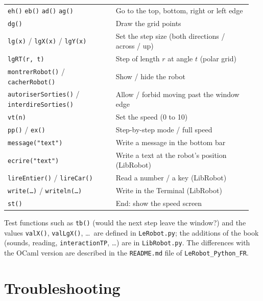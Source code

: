 \documentclass[11pt,a4paper]{article}
\newcommand{\kbd}[1]{\texttt{#1}}
\begin{document}
\begin{longtable}{@{}p{0.42\linewidth} p{0.53\linewidth}@{}}
\kbd{eh()} \kbd{eb()} \kbd{ad()} \kbd{ag()} & Go to the top, bottom, right or left edge \\
\kbd{dg()} & Draw the grid points \\
\kbd{lg(x)} / \kbd{lgX(x)} / \kbd{lgY(x)} & Set the step size (both directions / across / up) \\
\kbd{lgRT(r, t)} & Step of length $r$ at angle $t$ (polar grid) \\
\kbd{montrerRobot()} / \kbd{cacherRobot()} & Show / hide the robot \\
\kbd{autoriserSorties()} / \kbd{interdireSorties()} & Allow / forbid moving past the window edge \\
\kbd{vt(n)} & Set the speed (0 to 10) \\
\kbd{pp()} / \kbd{ex()} & Step-by-step mode / full speed \\
\kbd{message("text")} & Write a message in the bottom bar \\
\kbd{ecrire("text")} & Write a text at the robot's position (LibRobot) \\
\kbd{lireEntier()} / \kbd{lireCar()} & Read a number / a key (LibRobot) \\
\kbd{write(\dots)} / \kbd{writeln(\dots)} & Write in the Terminal (LibRobot) \\
\kbd{st()} & End: show the speed screen \\
\end{longtable}

Test functions such as \kbd{tb()} (would the next step leave the window?)
and the values \kbd{valX()}, \kbd{valLgX()}, \dots\ are defined in
\kbd{LeRobot.py}; the additions of the book (sounds,
reading, \kbd{interactionTP}, \dots) are in \kbd{LibRobot.py}. The
differences with the OCaml version are described in the \kbd{README.md}
file of \kbd{LeRobot\_Python\_FR}.

\section{Troubleshooting}
\end{document}
